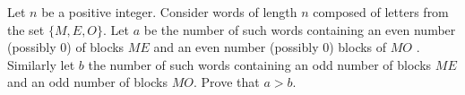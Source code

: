Let $ n $ be a positive integer. Consider words of length $n$ composed of letters from the set $ \{ M, E, O \} $. Let $ a $ be the number of such words containing an even number (possibly 0) of blocks $ ME $ and an even number (possibly 0) blocks of $ MO $ . Similarly let $ b $ the number of such words containing an odd number of blocks $ ME $ and an odd number of blocks $ MO $. Prove that $ a>b $.